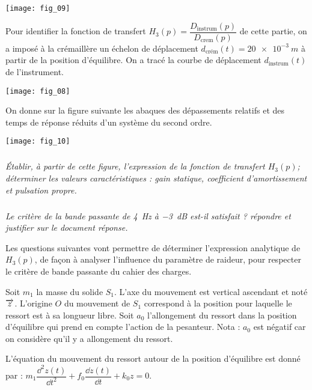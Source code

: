 \begin{multicols}{2}
\begin{center}
\texttt{[image: fig\_09]}
\end{center}

Pour identifier la fonction de transfert $H_3(p)=\dfrac{D_{\text{instrum}}(p)}{D_{\text{crem}}(p)}$ de cette partie, on a imposé à la crémaillère un échelon de déplacement $d_{\text{crém}}(t) = \SI{20e-3}{m}$ à partir de la position d’équilibre. On a tracé la courbe de déplacement $d_{\text{instrum}}(t)$ de l’instrument.

\begin{center}
\texttt{[image: fig\_08]}
\end{center}

On donne sur la figure suivante les abaques des dépassements relatifs et des temps de réponse réduits d’un système du second ordre.

\begin{center}
\texttt{[image: fig\_10]}
\end{center}


\subparagraph{}\textit{Établir, à partir de cette figure, l’expression de la fonction de transfert $H_3(p)$; déterminer les valeurs caractéristiques : gain statique, coefficient d’amortissement et pulsation propre.}
\ifprof
\begin{corrige}
\end{corrige}
\else
\fi


\subparagraph{}\textit{Le critère de la bande passante de \SI{4}{Hz} à  \SI{-3}{dB} est-il satisfait ? répondre et justifier sur le document réponse.}
\ifprof
\begin{corrige}
\end{corrige}
\else
\fi



Les questions suivantes vont permettre de déterminer l’expression analytique de $H_3(p)$, de façon à analyser l’influence du paramètre de raideur, pour respecter le critère de bande passante du cahier des charges.

Soit $m_1$ la masse du solide $S_1$. L’axe du mouvement est vertical ascendant et noté $\overrightarrow{z}$. L’origine $O$ du mouvement de $S_1$ correspond à la position pour laquelle le ressort est à sa longueur libre.
Soit $a_0$ l’allongement du ressort dans la position d’équilibre qui prend en compte l’action de la pesanteur. 
Nota : $a_0$ est négatif car on considère qu’il y a allongement du ressort.

L'équation du mouvement du ressort autour de la position d'équilibre est donné par : $m_1\dfrac{\dd^2 z(t)}{\dd t^2} + f_0 \dfrac{\dd z (t)}{\dd t}+k_0 z = 0$.


\end{multicols}

